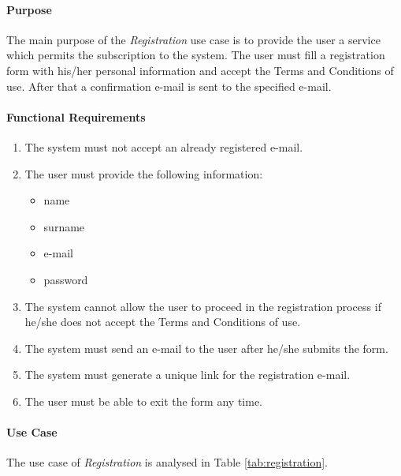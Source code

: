 \paragraph*{Purpose\\}

The main purpose of the \emph{Registration} use case is to provide the user a service which permits the subscription to the system. The user must fill a registration form with his/her personal information and accept the Terms and Conditions of use. After that a confirmation e-mail is sent to the specified e-mail.

\paragraph{Functional Requirements}
\begin{enumerate}[label=R.\arabic*:]
	\item The system must not accept an already registered e-mail.
	\item The user must provide the following information:
	\begin{itemize}
		\item name
		\item surname
		\item e-mail
		\item password
	\end{itemize}
	\item The system cannot allow the user to proceed in the registration process if he/she does not accept the Terms and Conditions of use.
	\item The system must send an e-mail to the user after he/she submits the form.	
	\item The system must generate a unique link for the registration e-mail.
	\item The user must be able to exit the form any time.
\end{enumerate}

\paragraph*{Use Case\\}
The use case of \emph{Registration} is analysed in Table \ref{tab:registration}.

